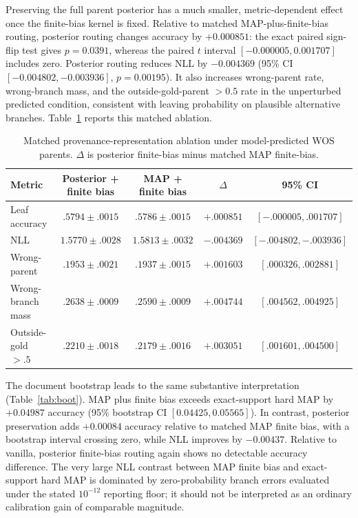 \documentclass[preprint,11pt]{elsarticle}
\begin{document}
Preserving the full parent posterior has a much smaller, metric-dependent effect once the finite-bias kernel is fixed. Relative to matched MAP-plus-finite-bias routing, posterior routing changes accuracy by $+0.000851$: the exact paired sign-flip test gives $p=0.0391$, whereas the paired $t$ interval $[-0.000005,0.001707]$ includes zero. Posterior routing reduces NLL by $-0.004369$ (95\% CI $[-0.004802,-0.003936]$, $p=0.00195$). It also increases wrong-parent rate, wrong-branch mass, and the outside-gold-parent $>0.5$ rate in the unperturbed predicted condition, consistent with leaving probability on plausible alternative branches. Table~\ref{tab:matched} reports this matched ablation.

\begin{table}[H]
\centering
\caption{Matched provenance-representation ablation under model-predicted WOS parents. $\Delta$ is posterior finite-bias minus matched MAP finite-bias.}
\label{tab:matched}
\scriptsize
\begin{tabular}{lcccc}
\toprule
Metric & Posterior + finite bias & MAP + finite bias & $\Delta$ & 95\% CI\\
\midrule
Leaf accuracy & $.5794\pm.0015$ & $.5786\pm.0015$ & $+.000851$ & $[-.000005,.001707]$\\
NLL & $1.5770\pm.0028$ & $1.5813\pm.0032$ & $-.004369$ & $[-.004802,-.003936]$\\
Wrong-parent & $.1953\pm.0021$ & $.1937\pm.0015$ & $+.001603$ & $[.000326,.002881]$\\
Wrong-branch mass & $.2638\pm.0009$ & $.2590\pm.0009$ & $+.004744$ & $[.004562,.004925]$\\
Outside-gold $>.5$ & $.2210\pm.0018$ & $.2179\pm.0016$ & $+.003051$ & $[.001601,.004500]$\\
\bottomrule
\end{tabular}
\end{table}

The document bootstrap leads to the same substantive interpretation (Table~\ref{tab:boot}). MAP plus finite bias exceeds exact-support hard MAP by $+0.04987$ accuracy (95\% bootstrap CI $[0.04425,0.05565]$). In contrast, posterior preservation adds $+0.00084$ accuracy relative to matched MAP finite bias, with a bootstrap interval crossing zero, while NLL improves by $-0.00437$. Relative to vanilla, posterior finite-bias routing again shows no detectable accuracy difference. The very large NLL contrast between MAP finite bias and exact-support hard MAP is dominated by zero-probability branch errors evaluated under the stated $10^{-12}$ reporting floor; it should not be interpreted as an ordinary calibration gain of comparable magnitude.
\end{document}
